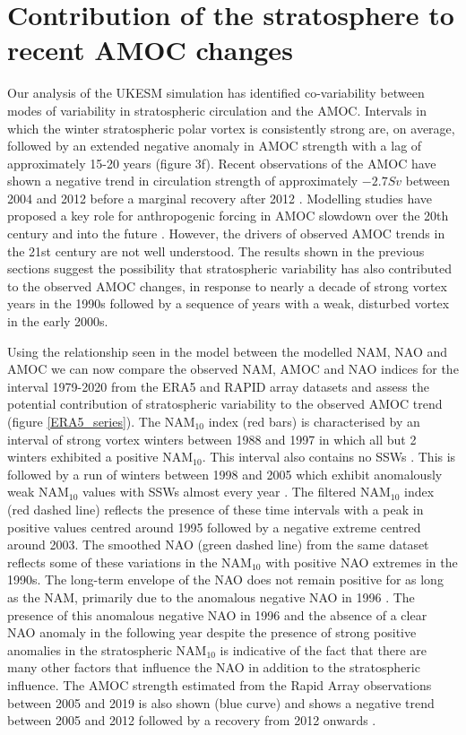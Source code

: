 \section{Contribution of the stratosphere to recent AMOC changes}
\label{sec:AMOC_obs_contribution}
Our analysis of the UKESM simulation has identified co-variability between modes of variability in stratospheric circulation and the AMOC. Intervals in which the winter stratospheric polar vortex is consistently strong are, on average, followed by an extended negative anomaly in AMOC strength with a lag of approximately 15-20 years (figure 3f). Recent observations of the AMOC have shown a negative trend in circulation strength of approximately $-2.7 Sv$ between 2004 and 2012 \citep{smeedNorth2018} before a marginal recovery after 2012 \citep{smeedAtlantic2019c}. Modelling studies have proposed a key role for anthropogenic forcing in AMOC slowdown over the 20th century and into the future \citep{liuOverlooked2017a, bakkerFate2016b, liuMechanisms2019b}. However, the drivers of observed AMOC trends in the 21st century are not well understood. The results shown in the previous sections suggest the possibility that stratospheric variability has also contributed to the observed AMOC changes, in response to nearly a decade of strong vortex years in the 1990s followed by a sequence of years with a weak, disturbed vortex in the early 2000s. 

Using the relationship seen in the model between the modelled NAM, NAO and AMOC we can now compare the observed NAM, AMOC and NAO indices for the interval 1979-2020 from the ERA5 and RAPID array datasets and assess the potential contribution of stratospheric variability to the observed AMOC trend (figure \ref{ERA5_series}). The NAM$_{10}$ index (red bars) is characterised by an interval of strong vortex winters between 1988 and 1997 in which all but 2 winters exhibited a positive NAM$_{10}$. This interval also contains no SSWs \citep{pawsonCold1999}. This is followed by a run of winters between 1998 and 2005 which exhibit anomalously weak NAM$_{10}$ values with SSWs almost every year  \cite{manneyRemarkable2005a}. The filtered NAM$_{10}$ index (red dashed line) reflects the presence of these time intervals with a peak in positive values centred around 1995 followed by a negative extreme centred around 2003. The smoothed NAO (green dashed line) from the same dataset reflects some of these variations in the NAM$_{10}$ with positive NAO extremes in the 1990s. The long-term envelope of the NAO does not remain positive for as long as the NAM, primarily due to the anomalous negative NAO in 1996 \citep{halpertClimate1997b}. The presence of this anomalous negative NAO in 1996 and the absence of a clear NAO anomaly in the following year despite the presence of strong positive anomalies in the stratospheric NAM$_{10}$ is indicative of the fact that there are many other factors that influence the NAO in addition to the stratospheric influence. The AMOC strength estimated from the Rapid Array observations between 2005 and 2019 is also shown (blue curve) and shows a negative trend between 2005 and 2012 followed by a recovery from 2012 onwards \citep{smeedNorth2018b, smeedAtlantic2019c}. 

